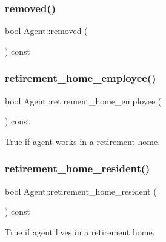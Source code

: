\subsubsection{\texorpdfstring{removed()}{removed()}}
{\footnotesize\ttfamily bool Agent\+::removed (\begin{DoxyParamCaption}{ }\end{DoxyParamCaption}) const\hspace{0.3cm}{\ttfamily [inline]}}

\mbox{\label{classAgent_a6283111c121ebf8985810b69a51eb951}} 
\subsubsection{\texorpdfstring{retirement\+\_\+home\+\_\+employee()}{retirement\_home\_employee()}}
{\footnotesize\ttfamily bool Agent\+::retirement\+\_\+home\+\_\+employee (\begin{DoxyParamCaption}{ }\end{DoxyParamCaption}) const\hspace{0.3cm}{\ttfamily [inline]}}



True if agent works in a retirement home. 

\mbox{\label{classAgent_aa38f589ea0afe69b5079c559862bff19}} 
\subsubsection{\texorpdfstring{retirement\+\_\+home\+\_\+resident()}{retirement\_home\_resident()}}
{\footnotesize\ttfamily bool Agent\+::retirement\+\_\+home\+\_\+resident (\begin{DoxyParamCaption}{ }\end{DoxyParamCaption}) const\hspace{0.3cm}{\ttfamily [inline]}}



True if agent lives in a retirement home. 

\mbox{\label{classAgent_a47890cf31361127f97856265d1ea0576}} 
